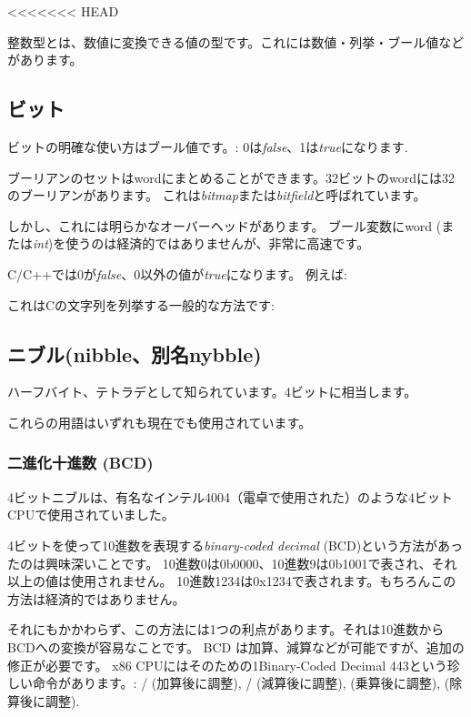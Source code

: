 <<<<<<< HEAD

整数型とは、数値に変換できる値の型です。これには数値・列挙・ブール値などがあります。

\subsection{ビット}

ビットの明確な使い方はブール値です。: 0は\emph{false}、1は\emph{true}になります.

ブーリアンのセットは\gls{word}にまとめることができます。32ビットのwordには32のブーリアンがあります。
これは\emph{bitmap}または\emph{bitfield}と呼ばれています。

しかし、これには明らかなオーバーヘッドがあります。
ブール変数に\gls{word} (または\emph{int})を使うのは経済的ではありませんが、非常に高速です。

C/C++では0が\emph{false}、0以外の値が\emph{true}になります。
例えば:



これはCの文字列を列挙する一般的な方法です:



\subsection{ニブル(nibble、別名nybble)}

ハーフバイト、テトラデ\ac{として知られています}。4ビットに相当します。

これらの用語はいずれも現在でも使用されています。

\subsubsection{二進化十進数 (\ac{BCD})}
\label{BCD}


4ビットニブルは、有名なインテル4004（電卓で使用された）のような4ビットCPUで使用されていました。

4ビットを使って10進数を表現する\emph{binary-coded decimal} (\ac{BCD})という方法があったのは興味深いことです。
10進数0は0b0000、10進数9は0b1001で表され、それ以上の値は使用されません。
10進数1234は0x1234で表されます。もちろんこの方法は経済的ではありません。

それにもかかわらず、この方法には1つの利点があります。それは10進数から\ac{BCD}への変換が容易なことです。
BCD は加算、減算などが可能ですが、追加の修正が必要です。 
x86 CPUにはそのための1Binary-Coded Decimal 443という珍しい命令があります。:
/ (加算後に調整),
/ (減算後に調整),
 (乗算後に調整),
 (除算後に調整).

